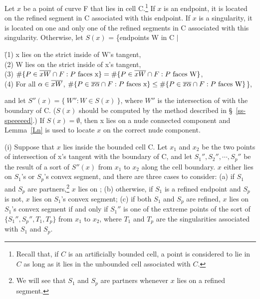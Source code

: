 \begin{theorem}
\label{Tps}
Let $x$ be a point of curve F that lies in cell C.\footnote{Recall that, 
	if $C$ is an artificially bounded cell,
	a point is considered to lie in $C$ as long as it lies in the unbounded cell
	associated with $C$.}
If $x$ is an endpoint, it is located on the refined segment in C associated
with this endpoint.
If $x$ is a singularity,
it is located on one and only one of the refined segments in C associated with this 
singularity.
Otherwise, let $S(x)$ = \{endpoints W in C $\mid$
\begin{tabbing}
\hspace{.1in} \= {\rm (1)} x lies on the strict inside of W's tangent,\\
\> {\rm (2)} W lies on the strict inside of x's tangent,\\
\> {\rm (3)} \mbox{$\#\{P \in\mbox{$\overline{xW}$}\cap F: P \mbox{ faces x}\} =
\#\{P \in \mbox{$\overline{xW}$}\cap F: P \mbox{ faces W} \}$},\\
\> {\rm (4)} For all $\alpha \in \mbox{$\overline{xW}$}$,
$\#\{P \in\mbox{$\overline{x\alpha}$}\cap F: P \mbox{ faces x}\} \leq
\#\{P \in \mbox{$\overline{x\alpha}$}\cap F: P \mbox{ faces W}\}$\},
\end{tabbing}
%
\noindent and let $S''(x) = \{\ W'' : W \in S(x)\ \}$, where $W''$ is the intersection 
of  with the boundary of C.
{\rm (}$S(x)$ should be computed by the method described in \S~{\rm\ref{ss-speeeeed}.)}
If $S(x) = \emptyset$, then x lies on a nude connected component and Lemma~{\rm\ref{Ln}}
is used to locate $x$ on the correct nude component.

{\rm (i)} Suppose that $x$ lies inside the bounded cell C.
Let $x_{1}$ and $x_{2}$ be the two points of intersection of x's tangent with the
boundary of C, and let $S_{1}'',S_{2}'',\cdots,S_{p}''$ be the result of a sort of $S''(x)$ 
from $x_{1}$ to $x_{2}$ along the cell boundary.
$x$ either lies on $S_{1}$'s or $S_{p}$'s convex segment,
% 
%
and there are three cases to consider:
{\rm (a)} if $S_{1}$ and $S_{p}$ are partners,\footnote{We will see that $S_{1}$ and $S_{p}$ 
	are partners whenever $x$ lies on a refined segment.}
$x$ lies on ;
{\rm (b)} otherwise, if $S_{1}$ is a refined endpoint and 
$S_{p}$ is not, $x$ lies on $S_{1}$'s convex segment;
{\rm (c)} if both $S_{1}$ and $S_{p}$ are refined,
$x$ lies on $S_{1}$'s convex segment if and only if 
$S_{1}''$ is one of the extreme points of the sort
of $\{S_{1}'',S_{p}'',T_{1},T_{p}\}$ from $x_{1}$ to $x_{2}$, where
$T_{1}$ and $T_{p}$ are the singularities
associated with $S_{1}$ and $S_{p}$.


\end{theorem}
